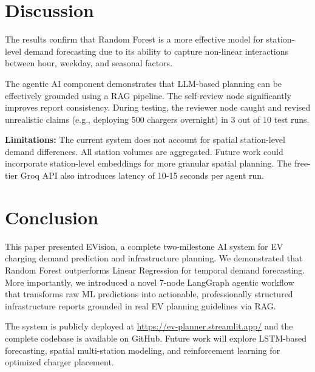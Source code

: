 \documentclass[conference]{IEEEtran}
\begin{document}
\section{Discussion}

The results confirm that Random Forest is a more effective model for station-level demand forecasting due to its ability to capture non-linear interactions between hour, weekday, and seasonal factors.

The agentic AI component demonstrates that LLM-based planning can be effectively grounded using a RAG pipeline. The self-review node significantly improves report consistency. During testing, the reviewer node caught and revised unrealistic claims (e.g., deploying 500 chargers overnight) in 3 out of 10 test runs.

\textbf{Limitations:} The current system does not account for spatial station-level demand differences. All station volumes are aggregated. Future work could incorporate station-level embeddings for more granular spatial planning. The free-tier Groq API also introduces latency of 10-15 seconds per agent run.

\section{Conclusion}

This paper presented EVision, a complete two-milestone AI system for EV charging demand prediction and infrastructure planning. We demonstrated that Random Forest outperforms Linear Regression for temporal demand forecasting. More importantly, we introduced a novel 7-node LangGraph agentic workflow that transforms raw ML predictions into actionable, professionally structured infrastructure reports grounded in real EV planning guidelines via RAG.

The system is publicly deployed at \url{https://ev-planner.streamlit.app/} and the complete codebase is available on GitHub. Future work will explore LSTM-based forecasting, spatial multi-station modeling, and reinforcement learning for optimized charger placement.
\end{document}
